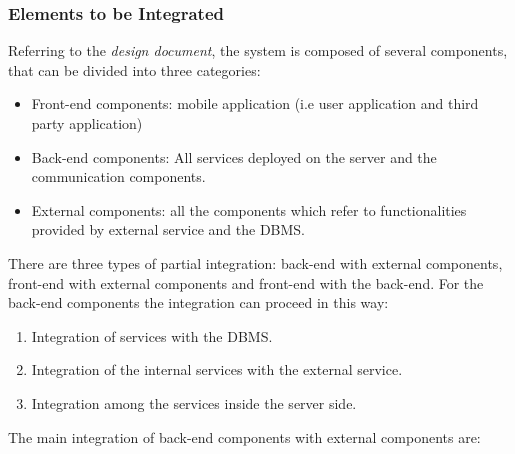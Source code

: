 \subsubsection{Elements to be Integrated}
Referring to the \textit{design document}, the system is composed of several components, that can be divided into three categories: 
\begin{itemize}
\item Front-end components: mobile application (i.e user application and third party application)
\item Back-end components: All services deployed on the server and the communication components.
\item External components: all the components which refer to functionalities provided by external service and the DBMS.
\end{itemize}
There are three types of partial integration: back-end with external components, front-end with external components and front-end with the back-end. For the back-end components the integration can proceed in this way:
\begin{enumerate}
\item Integration of services with the DBMS.
\item Integration of the internal services with the external service.
\item Integration among the services inside the server side.  
\end{enumerate}
The main integration of back-end components with external components are: 
